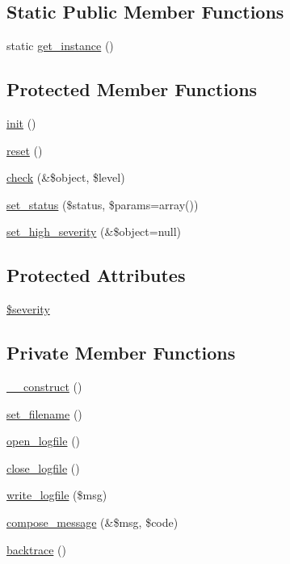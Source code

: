 \subsection*{Static Public Member Functions}
\begin{DoxyCompactItemize}
\item 
static \hyperlink{classLogHandler_aff978ec836c28d7b6e08a84802aa1c6d}{get\_\-instance} ()
\end{DoxyCompactItemize}
\subsection*{Protected Member Functions}
\begin{DoxyCompactItemize}
\item 
\hyperlink{class__OWL_ae0ef3ded56e8a6b34b6461e5a721cd3e}{init} ()
\item 
\hyperlink{class__OWL_a2f2a042bcf31965194c03033df0edc9b}{reset} ()
\item 
\hyperlink{class__OWL_ad6f4f6946f40199dd0333cf219fa500e}{check} (\&\$object, \$level)
\item 
\hyperlink{class__OWL_aea912d0ede9b3c2a69b79072d94d4787}{set\_\-status} (\$status, \$params=array())
\item 
\hyperlink{class__OWL_a576829692a3b66e3d518853bf43abae3}{set\_\-high\_\-severity} (\&\$object=null)
\end{DoxyCompactItemize}
\subsection*{Protected Attributes}
\begin{DoxyCompactItemize}
\item 
\hyperlink{class__OWL_ad26b40a9dbbacb33e299b17826f8327c}{\$severity}
\end{DoxyCompactItemize}
\subsection*{Private Member Functions}
\begin{DoxyCompactItemize}
\item 
\hyperlink{classLogHandler_aacca49c4394109f4ccc494048a0b2cab}{\_\-\_\-construct} ()
\item 
\hyperlink{classLogHandler_a65ef4f1c6ab4cff4057f5f5932cc690e}{set\_\-filename} ()
\item 
\hyperlink{classLogHandler_aaf324e5156bf8ea83e5b4e990ea99e2d}{open\_\-logfile} ()
\item 
\hyperlink{classLogHandler_a1a3b03d9bb97404a4f746bd2aacc5a8c}{close\_\-logfile} ()
\item 
\hyperlink{classLogHandler_ae0cd68fb6f068e47f899a1e4c7f29ba9}{write\_\-logfile} (\$msg)
\item 
\hyperlink{classLogHandler_ad32511521115b21779d699c836197dd0}{compose\_\-message} (\&\$msg, \$code)
\item 
\hyperlink{classLogHandler_a441d505d1dfb81bd86dc1d3c53600552}{backtrace} ()
\end{DoxyCompactItemize}
